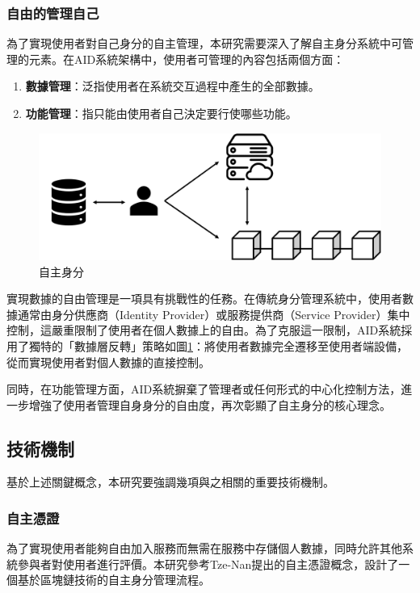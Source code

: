 \subsubsection{自由的管理自己}
為了實現使用者對自己身分的自主管理，本研究需要深入了解自主身分系統中可管理的元素。在AID系統架構中，使用者可管理的內容包括兩個方面：
\begin{enumerate}
  \item \textbf{數據管理}：泛指使用者在系統交互過程中產生的全部數據。
  \item \textbf{功能管理}：指只能由使用者自己決定要行使哪些功能。
\end{enumerate}
\begin{figure}
  \centering
  \includegraphics[width=\linewidth,keepaspectratio]{figures/aid.png}
  \caption{自主身分}
  \label{fig:aid}
\end{figure}
實現數據的自由管理是一項具有挑戰性的任務。在傳統身分管理系統中，使用者數據通常由身分供應商（Identity Provider）或服務提供商（Service Provider）集中控制，這嚴重限制了使用者在個人數據上的自由。為了克服這一限制，AID系統採用了獨特的「數據層反轉」策略如圖\ref{fig:aid}：將使用者數據完全遷移至使用者端設備，從而實現使用者對個人數據的直接控制。

同時，在功能管理方面，AID系統摒棄了管理者或任何形式的中心化控制方法，進一步增強了使用者管理自身身分的自由度，再次彰顯了自主身分的核心理念。
\subsection{技術機制}
基於上述關鍵概念，本研究要強調幾項與之相關的重要技術機制。
\subsubsection{自主憑證}
為了實現使用者能夠自由加入服務而無需在服務中存儲個人數據，同時允許其他系統參與者對使用者進行評價。本研究參考Tze-Nan\cite{NTU202102846}提出的自主憑證概念，設計了一個基於區塊鏈技術的自主身分管理流程。

